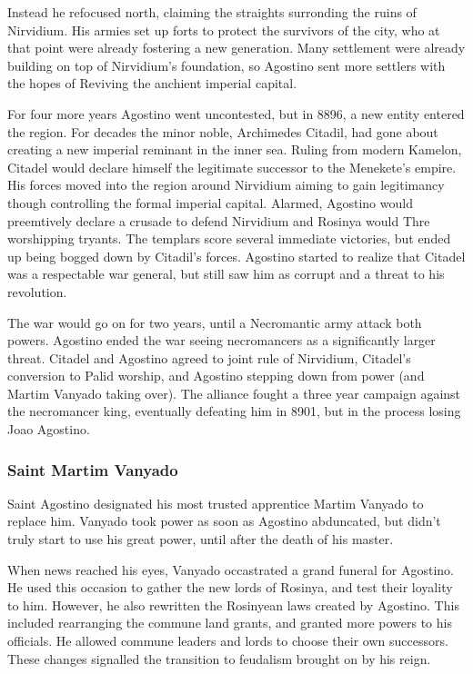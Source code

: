 \documentclass[../main.tex]{subfiles}
\begin{document}
Instead he refocused north, claiming the straights surronding the ruins of Nirvidium. His armies set up forts to protect 
the survivors of the city, who at that point were already fostering a new generation. Many settlement were already building 
on top of Nirvidium's foundation, so Agostino sent more settlers with the hopes of Reviving the anchient imperial capital. 

For four more years Agostino went uncontested, but in 8896, a new entity entered the region. For decades the minor noble,
Archimedes Citadil, had gone about creating a new imperial reminant in the inner sea. Ruling from modern Kamelon, Citadel 
would declare himself the legitimate successor to the Menekete's empire. His forces moved into the region around Nirvidium
aiming to gain legitimancy though controlling the formal imperial capital. Alarmed, Agostino would preemtively declare a
crusade to defend Nirvidium and Rosinya would Thre worshipping tryants. The templars score several immediate victories,
but ended up being bogged down by Citadil's forces. Agostino started to realize that Citadel was a respectable war general,
but still saw him as corrupt and a threat to his revolution. 

The war would go on for two years, until a Necromantic army attack both powers. Agostino ended the war seeing necromancers
as a significantly larger threat. Citadel and Agostino agreed to joint rule of Nirvidium, Citadel's conversion to Palid worship,
and Agostino stepping down from power (and Martim Vanyado taking over). The alliance fought a three year campaign against 
the necromancer king, eventually defeating him in 8901, but in the process losing Joao Agostino.  


\subsubsection{Saint Martim Vanyado}
Saint Agostino designated his most trusted apprentice Martim Vanyado to replace him.
Vanyado took power as soon as Agostino abduncated, but didn't truly start to use his 
great power, until after the death of his master. 

When news reached his eyes, Vanyado occastrated a grand funeral for Agostino. He used this
occasion to gather the new lords of Rosinya, and test their loyality to him. However, he also
rewritten the Rosinyean laws created by Agostino. This included rearranging the commune land 
grants, and granted more powers to his officials. He allowed commune leaders and lords to choose
their own successors. These changes signalled the transition to feudalism brought on by his reign.
\end{document}
